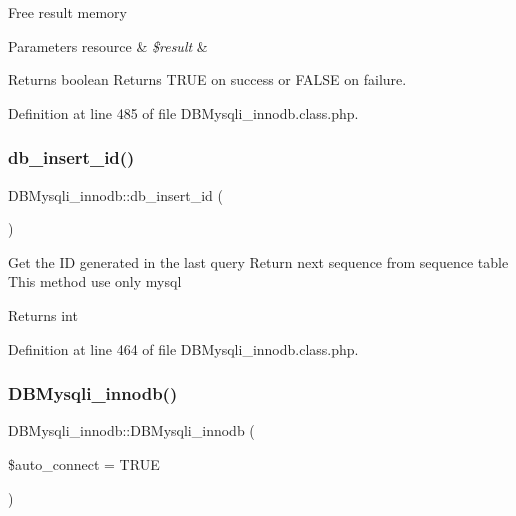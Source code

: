 Free result memory 
\begin{DoxyParams}[1]{Parameters}
resource & {\em \$result} & \\
\hline
\end{DoxyParams}
\begin{DoxyReturn}{Returns}
boolean Returns T\+R\+UE on success or F\+A\+L\+SE on failure. 
\end{DoxyReturn}


Definition at line 485 of file D\+B\+Mysqli\+\_\+innodb.\+class.\+php.

\mbox{\label{classDBMysqli__innodb_aec47da41558bdf42e9d2fe31c2ce87f2}} 
\subsubsection{\texorpdfstring{db\+\_\+insert\+\_\+id()}{db\_insert\_id()}}
{\footnotesize\ttfamily D\+B\+Mysqli\+\_\+innodb\+::db\+\_\+insert\+\_\+id (\begin{DoxyParamCaption}{ }\end{DoxyParamCaption})}

Get the ID generated in the last query Return next sequence from sequence table This method use only mysql \begin{DoxyReturn}{Returns}
int 
\end{DoxyReturn}


Definition at line 464 of file D\+B\+Mysqli\+\_\+innodb.\+class.\+php.

\mbox{\label{classDBMysqli__innodb_a0802ef8a893610ae107ca25b77080bcc}} 
\subsubsection{\texorpdfstring{D\+B\+Mysqli\+\_\+innodb()}{DBMysqli\_innodb()}}
{\footnotesize\ttfamily D\+B\+Mysqli\+\_\+innodb\+::\+D\+B\+Mysqli\+\_\+innodb (\begin{DoxyParamCaption}\item[{}]{\$auto\+\_\+connect = {\ttfamily TRUE} }\end{DoxyParamCaption})}

